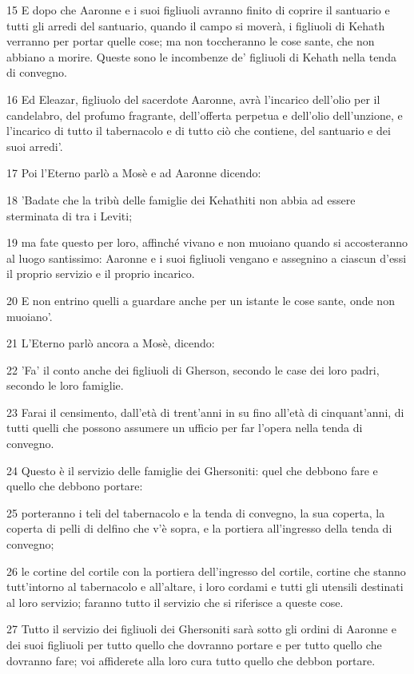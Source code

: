 \par 15 E dopo che Aaronne e i suoi figliuoli avranno finito di coprire il santuario e tutti gli arredi del santuario, quando il campo si moverà, i figliuoli di Kehath verranno per portar quelle cose; ma non toccheranno le cose sante, che non abbiano a morire. Queste sono le incombenze de' figliuoli di Kehath nella tenda di convegno.
\par 16 Ed Eleazar, figliuolo del sacerdote Aaronne, avrà l'incarico dell'olio per il candelabro, del profumo fragrante, dell'offerta perpetua e dell'olio dell'unzione, e l'incarico di tutto il tabernacolo e di tutto ciò che contiene, del santuario e dei suoi arredi'.
\par 17 Poi l'Eterno parlò a Mosè e ad Aaronne dicendo:
\par 18 'Badate che la tribù delle famiglie dei Kehathiti non abbia ad essere sterminata di tra i Leviti;
\par 19 ma fate questo per loro, affinché vivano e non muoiano quando si accosteranno al luogo santissimo: Aaronne e i suoi figliuoli vengano e assegnino a ciascun d'essi il proprio servizio e il proprio incarico.
\par 20 E non entrino quelli a guardare anche per un istante le cose sante, onde non muoiano'.
\par 21 L'Eterno parlò ancora a Mosè, dicendo:
\par 22 'Fa' il conto anche dei figliuoli di Gherson, secondo le case dei loro padri, secondo le loro famiglie.
\par 23 Farai il censimento, dall'età di trent'anni in su fino all'età di cinquant'anni, di tutti quelli che possono assumere un ufficio per far l'opera nella tenda di convegno.
\par 24 Questo è il servizio delle famiglie dei Ghersoniti: quel che debbono fare e quello che debbono portare:
\par 25 porteranno i teli del tabernacolo e la tenda di convegno, la sua coperta, la coperta di pelli di delfino che v'è sopra, e la portiera all'ingresso della tenda di convegno;
\par 26 le cortine del cortile con la portiera dell'ingresso del cortile, cortine che stanno tutt'intorno al tabernacolo e all'altare, i loro cordami e tutti gli utensili destinati al loro servizio; faranno tutto il servizio che si riferisce a queste cose.
\par 27 Tutto il servizio dei figliuoli dei Ghersoniti sarà sotto gli ordini di Aaronne e dei suoi figliuoli per tutto quello che dovranno portare e per tutto quello che dovranno fare; voi affiderete alla loro cura tutto quello che debbon portare.
